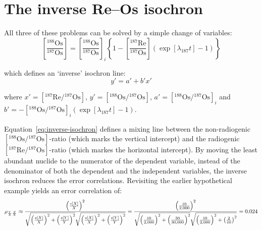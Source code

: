 \documentclass[]{article}
\begin{document}
\section{The inverse Re--Os isochron}

All three of these problems can be solved by a simple change of
variables:
\begin{equation}
  \left[\frac{{}^{188}\mbox{Os}}{{}^{187}\mbox{Os}}\right] =
  \left[\frac{{}^{188}\mbox{Os}}{{}^{187}\mbox{Os}}\right]_i
  \left\{
    1 -
  \left[\frac{{}^{187}\mbox{Re}}{{}^{187}\mbox{Os}}\right]
  \left(\exp[\lambda_{187}t]-1\right)
  \right\}
  \label{eq:inverse-isochron}
\end{equation}

\noindent which defines an `inverse' isochron line:
\begin{equation}
  y' = a' + b' x'
  \label{eq:y'=a'+b'x'}
\end{equation}

\noindent where
$x'=\left[{{}^{187}\mbox{Re}}/{{}^{187}\mbox{Os}}\right]$,
$y'=\left[{{}^{188}\mbox{Os}}/{{}^{187}\mbox{Os}}\right]$,
$a'=\left[{{}^{188}\mbox{Os}}/{{}^{187}\mbox{Os}}\right]_i$ and
$b'=-\left[{{}^{188}\mbox{Os}}/{{}^{187}\mbox{Os}}\right]_i\left(\exp[\lambda_{187}t]-1\right)$.

Equation~\ref{eq:inverse-isochron} defines a mixing line between the
non-radiogenic
$\left[{{}^{188}\mbox{Os}}/{{}^{187}\mbox{Os}}\right]$-ratio (which
marks the vertical intercept) and the radiogenic
$\left[{{}^{187}\mbox{Re}}/{{}^{187}\mbox{Os}}\right]$-ratio (which
markes the horizontal intercept). By moving the least abundant nuclide
to the numerator of the dependent variable, instead of the denominator
of both the dependent and the independent variables, the inverse
isochron reduces the error correlations. Revisiting the earlier
hypothetical example yields an error correlation of:
\begin{equation}
  \noindent \rho_{\frac{Y}{X}\frac{Z}{X}} \approx
  \frac{
    \left(\frac{s[X]}{X}\right)^2
  }{
    \sqrt{\left(\frac{s[X]}{X}\right)^2 +
      \left(\frac{s[Y]}{Y}\right)^2}
    \sqrt{\left(\frac{s[X]}{X}\right)^2 +
      \left(\frac{s[Y]}{Y}\right)^2}
  }
  =
  \frac{
    \left(\frac{10}{2,000}\right)^2
  }{
    \sqrt{
      \left(\frac{10}{2,000}\right)^2 +
      \left(\frac{50}{30,000}\right)^2
    }
    \sqrt{
      \left(\frac{10}{2,000}\right)^2 + 
        \left(\frac{2}{10}\right)^2
    }
  }
  = 0.024
  \label{eq:spurious-inverse}
\end{equation}
\end{document}
